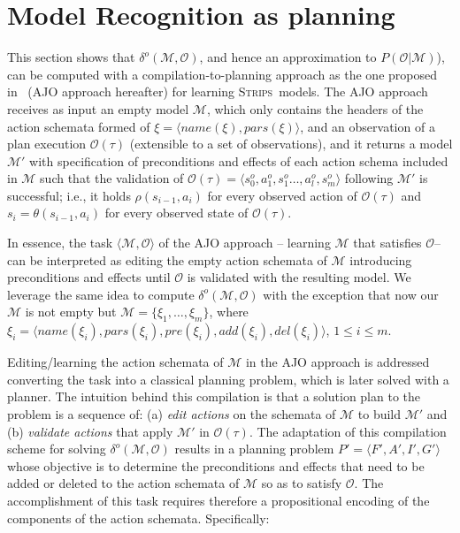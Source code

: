 \documentclass[letterpaper]{article} %
\newcommand{\tup}[1]{{\langle #1 \rangle}}
\newcommand{\strips}{\textsc{Strips}}     %
\begin{document}
\section{Model Recognition as planning}

This section shows that $\delta^o(\mathcal{M},\mathcal{O})$, and hence an approximation to $P(\mathcal{O}|\mathcal{M})$), can be computed with a compilation-to-planning approach as the one proposed in~\cite{aineto2018learning} (AJO approach hereafter) for learning \strips\ models. The AJO approach receives as input an empty model $\mathcal{M}$, which only contains the headers of the action schemata formed of $\xi=\tup{name(\xi),pars(\xi)}$, and an observation of a plan execution $\mathcal{O}(\tau)$ (extensible to a set of observations), and it returns a model $\mathcal{M'}$ with specification of preconditions and effects of each action schema included in $\mathcal{M}$ such that the validation of $\mathcal{O}(\tau)=\tup{s_0^o,a_1^o,s_1^o \ldots , a_l^o, s_m^o}$ following $\mathcal{M'}$ is successful; i.e., it holds $\rho(s_{i-1},a_i)$ for every observed action of $\mathcal{O}(\tau)$ and $s_i=\theta(s_{i-1},a_i)$ for every observed state of $\mathcal{O}(\tau)$.

In essence, the task $\tup{\mathcal{M},\mathcal{O}}$ of the AJO approach -- learning $\mathcal{M}$ that satisfies $\mathcal{O}$-- can be interpreted as editing the empty action schemata of $\mathcal{M}$ introducing preconditions and effects until $\mathcal{O}$ is validated with the resulting model. We leverage the same idea to compute $\delta^o(\mathcal{M},\mathcal{O})$ with the exception that now our $\mathcal{M}$ is not empty but $\mathcal{M}=\{\xi_1, \ldots, \xi_m\}$, where $\xi_i=\tup{name(\xi_i),pars(\xi_i),pre(\xi_i),add(\xi_i),del(\xi_i)}$, $1 \leq i \leq m$.

Editing/learning the action schemata of $\mathcal{M}$ in the AJO approach is addressed converting the task into a classical planning problem, which is later solved with a planner. The intuition behind this compilation is that a solution plan to the problem is a sequence of: (a) \emph{edit actions} on the schemata of $\mathcal{M}$ to build $\mathcal{M'}$ and (b) \emph{validate actions} that apply $\mathcal{M'}$ in $\mathcal{O(\tau)}$. The adaptation of this compilation scheme for solving $\delta^o(\mathcal{M},\mathcal{O})$ results in a planning problem $P'=\tup{F',A',I',G'}$ whose objective is to determine the preconditions and effects that need to be added or deleted to the action schemata of $\mathcal{M}$ so as to satisfy $\mathcal{O}$. The accomplishment of this task requires therefore a propositional encoding of the components of the action schemata. Specifically:
\end{document}
